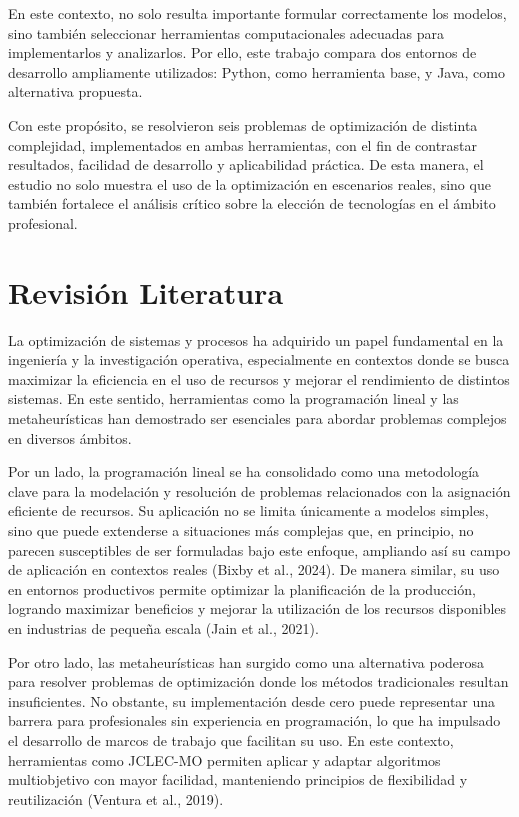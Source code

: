 \documentclass[12pt,a4paper]{article}
\begin{document}
En este contexto, no solo resulta importante formular correctamente los modelos, sino también seleccionar herramientas computacionales adecuadas para implementarlos y analizarlos. Por ello, este trabajo compara dos entornos de desarrollo ampliamente utilizados: Python, como herramienta base, y Java, como alternativa propuesta.

Con este propósito, se resolvieron seis problemas de optimización de distinta complejidad, implementados en ambas herramientas, con el fin de contrastar resultados, facilidad de desarrollo y aplicabilidad práctica. De esta manera, el estudio no solo muestra el uso de la optimización en escenarios reales, sino que también fortalece el análisis crítico sobre la elección de tecnologías en el ámbito profesional.

\section{Revisión Literatura}

La optimización de sistemas y procesos ha adquirido un papel fundamental en la ingeniería y la investigación operativa, especialmente en contextos donde se busca maximizar la eficiencia en el uso de recursos y mejorar el rendimiento de distintos sistemas. En este sentido, herramientas como la programación lineal y las metaheurísticas han demostrado ser esenciales para abordar problemas complejos en diversos ámbitos.

Por un lado, la programación lineal se ha consolidado como una metodología clave para la modelación y resolución de problemas relacionados con la asignación eficiente de recursos. Su aplicación no se limita únicamente a modelos simples, sino que puede extenderse a situaciones más complejas que, en principio, no parecen susceptibles de ser formuladas bajo este enfoque, ampliando así su campo de aplicación en contextos reales (Bixby et al., 2024). De manera similar, su uso en entornos productivos permite optimizar la planificación de la producción, logrando maximizar beneficios y mejorar la utilización de los recursos disponibles en industrias de pequeña escala (Jain et al., 2021).

Por otro lado, las metaheurísticas han surgido como una alternativa poderosa para resolver problemas de optimización donde los métodos tradicionales resultan insuficientes. No obstante, su implementación desde cero puede representar una barrera para profesionales sin experiencia en programación, lo que ha impulsado el desarrollo de marcos de trabajo que facilitan su uso. En este contexto, herramientas como JCLEC-MO permiten aplicar y adaptar algoritmos multiobjetivo con mayor facilidad, manteniendo principios de flexibilidad y reutilización (Ventura et al., 2019).
\end{document}
